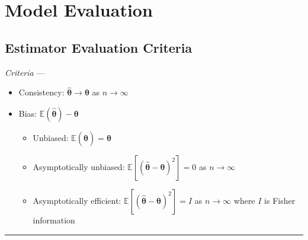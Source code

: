 \section{Model Evaluation}
\subsection*{Estimator Evaluation Criteria}
\emph{Criteria} --- 
\begin{itemize}
    \item Consistency: $\hat{\boldsymbol{\theta}} \rightarrow \boldsymbol{\theta}$ as $n \rightarrow \infty$
    \item Bias: $\mathbb{E}(\hat{\boldsymbol{\theta}}) - \boldsymbol{\theta}$
    \begin{itemize}
        \item Unbiased: $\mathbb{E}(\hat{\boldsymbol{\theta}}) = \boldsymbol{\theta}$
        \item Asymptotically unbiased: $\mathbb{E} [ ( \hat{\boldsymbol{\theta}} - \boldsymbol{\theta} )^2 ] = 0$ as $n \rightarrow \infty$ 
        \item Asymptotically efficient: $\mathbb{E} [ ( \hat{\boldsymbol{\theta}} - \boldsymbol{\theta} )^2 ] = I$ as $n \rightarrow \infty$  where $I$ is Fisher information 
    \end{itemize}
\end{itemize}

{\color{lightgray}\hrule height 0.001mm}

